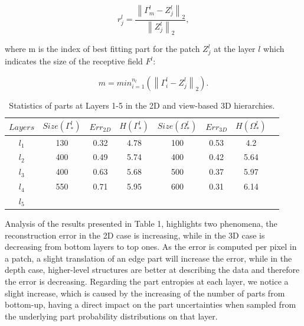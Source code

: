 \documentclass[runningheads]{llncs}
\begin{document}
\begin{equation}
 r_j^l = \frac{\left\|\Gamma_m^l-Z_j^l\right\|_2}{\left\|Z_j^l\right\|_2}, \end{equation}
 
 where m is the index of best fitting part for the patch $Z_j^l$ at the layer $l$ which indicates the size of the receptive field $F^l$:
 
\begin{equation}
 m=min_{i=1}^{n_l}(\left\|\Gamma_i^l-Z_j^l\right\|_2).
\end{equation}

 \begin{table}
 \begin{center}
  \begin{tabular}{ | c | c | c | c | c | c | c |r |}
      \hline
      $Layers$  & $Size(\Gamma_*^l)$ & $Err_{2D}$ & $H(\Gamma_*^l)$ &  $Size(\Omega_*^l)$ & $Err_{3D}$ & $H(\Omega_*^l)$  \\ \hline
    $l_1$ &  130  & 0.32 & 4.78 & 100 & 0.53 & 4.2 \\ \hline
    $l_2$ &  400 & 0.49 & 5.74 & 400 & 0.42 & 5.64 \\ \hline
    $l_3$ &  400 & 0.63 & 5.68 & 500 & 0.37 & 5.97 \\ \hline 
    $l_4$ &  550 & 0.71 & 5.95 & 600 & 0.31 & 6.14 \\ \hline
    $l_5$ &   &  &  &  &  &  \\ 
    \hline
  \end{tabular}
\end{center}
\caption{Statistics of parts at Layers 1-5 in the 2D and view-based 3D hierarchies.}
\end{table}

Analysis of the results presented in Table 1, highlights two phenomena, the reconstruction error in the 2D case is increasing, while in the 3D case is decreasing from bottom layers to top ones. As the error is computed per pixel in a patch, a slight translation of an edge part will increase the error, while in the depth case, higher-level structures are better at describing the data and therefore the error is decreasing. Regarding the part entropies at each layer, we notice a slight increase, which is caused by the increasing of the number of parts from bottom-up, having a direct impact on the part uncertainties when sampled from the underlying part probability distributions on that layer.
\end{document}
